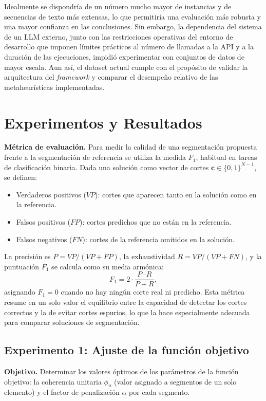 \documentclass[letterpaper, 12pt]{report}
\begin{document}
Idealmente se dispondría de un número mucho mayor de instancias y de secuencias de texto más extensas, lo que permitiría una evaluación más robusta y una mayor confianza en las conclusiones. Sin embargo, la dependencia del sistema de un LLM externo, junto con las restricciones operativas del entorno de desarrollo que imponen límites prácticos al número de llamadas a la API y a la duración de las ejecuciones, impidió experimentar con conjuntos de datos de mayor escala. Aun así, el dataset actual cumple con el propósito de validar la arquitectura del \textit{framework} y comparar el desempeño relativo de las metaheurísticas implementadas.



\chapter{Experimentos y Resultados}

\medskip
\noindent
\textbf{Métrica de evaluación.}
Para medir la calidad de una segmentación propuesta frente a la segmentación de referencia se utiliza la medida \(F_1\), habitual en tareas de clasificación binaria. Dada una solución como vector de cortes \(\mathbf{c} \in \{0,1\}^{N-1}\), se definen:
\begin{itemize}
    \item Verdaderos positivos (\(VP\)): cortes que aparecen tanto en la solución como en la referencia.
    \item Falsos positivos (\(FP\)): cortes predichos que no están en la referencia.
    \item Falsos negativos (\(FN\)): cortes de la referencia omitidos en la solución.
\end{itemize}
La precisión es \(P = VP/(VP+FP)\), la exhaustividad \(R = VP/(VP+FN)\), y la puntuación \(F_1\) se calcula como su media armónica:
\[
F_1 = 2 \cdot \frac{P \cdot R}{P + R},
\]
asignando \(F_1 = 0\) cuando no hay ningún corte real ni predicho. Esta métrica resume en un solo valor el equilibrio entre la capacidad de detectar los cortes correctos y la de evitar cortes espurios, lo que la hace especialmente adecuada para comparar soluciones de segmentación.


\section{Experimento 1: Ajuste de la función objetivo}

\medskip
\noindent
\textbf{Objetivo.}
Determinar los valores óptimos de los parámetros de la función objetivo: la coherencia unitaria \(\phi_u\) (valor asignado a segmentos de un solo elemento) y el factor de penalización \(\alpha\) por cada segmento.
\end{document}
